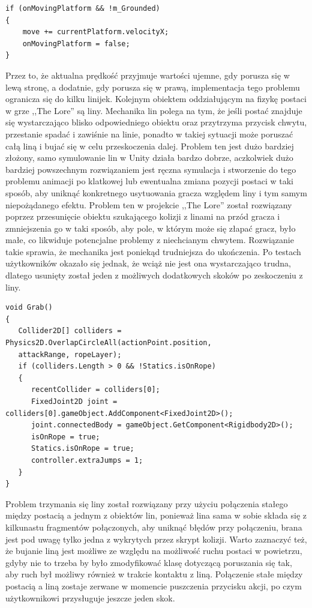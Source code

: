 \documentclass[oneside,polski,logo]{amuthesis}
\begin{document}
\begin{lstlisting}[breaklines=true,
language={[Sharp]C},
rulecolor=\color{blue!80!black},
caption={Fragment klasy \texttt{PlayerMovement.cs}}
]
if (onMovingPlatform && !m_Grounded)
{
	move += currentPlatform.velocityX;
	onMovingPlatform = false;
}
\end{lstlisting}
Przez to, że aktualna prędkość przyjmuje wartości ujemne, gdy porusza się w lewą stronę, a dodatnie, gdy porusza się w prawą, implementacja tego problemu ogranicza się do kilku linijek.
Kolejnym obiektem oddziałującym na fizykę postaci w grze ,,The Lore'' są liny. Mechanika lin polega na tym, że jeśli postać znajduje się wystarczająco blisko odpowiedniego obiektu oraz przytrzyma przycisk chwytu, przestanie spadać i zawiśnie na linie, ponadto w takiej sytuacji może poruszać całą liną i bujać się w celu przeskoczenia dalej. Problem ten jest dużo bardziej złożony, samo symulowanie lin w Unity działa bardzo dobrze, aczkolwiek dużo bardziej powszechnym rozwiązaniem jest ręczna symulacja i stworzenie do tego problemu animacji po klatkowej lub ewentualna zmiana pozycji postaci w taki sposób, aby uniknąć konkretnego usytuowania gracza względem liny i tym samym niepożądanego efektu. Problem ten w projekcie ,,The Lore'' został rozwiązany poprzez przesunięcie obiektu szukającego kolizji z linami na przód gracza i zmniejszenia go w taki sposób, aby pole, w którym może się złapać gracz, było małe, co likwiduje potencjalne problemy z niechcianym chwytem. Rozwiązanie takie sprawia, że mechanika jest poniekąd trudniejsza do ukończenia. Po testach użytkowników okazało się jednak, że wciąż nie jest ona wystarczająco trudna, dlatego usunięty został jeden z możliwych dodatkowych skoków po zeskoczeniu z liny.

\newpage
\begin{lstlisting}[breaklines=true,
language={[Sharp]C},
rulecolor=\color{blue!80!black},
caption={Fragment klasy \texttt{PlayerMovement.cs}}
]    
void Grab()
{
   Collider2D[] colliders = Physics2D.OverlapCircleAll(actionPoint.position,
   attackRange, ropeLayer);
   if (colliders.Length > 0 && !Statics.isOnRope)
   {
      recentCollider = colliders[0];
      FixedJoint2D joint = colliders[0].gameObject.AddComponent<FixedJoint2D>();
      joint.connectedBody = gameObject.GetComponent<Rigidbody2D>();
      isOnRope = true;
      Statics.isOnRope = true;
      controller.extraJumps = 1;
   }
}
\end{lstlisting}

Problem trzymania się liny został rozwiązany przy użyciu połączenia stałego między postacią a jednym z obiektów lin, ponieważ lina sama w sobie składa się z kilkunastu fragmentów połączonych, aby uniknąć błędów przy połączeniu, brana jest pod uwagę tylko jedna z wykrytych przez skrypt kolizji. Warto zaznaczyć też, że bujanie liną jest możliwe ze względu na możliwość ruchu postaci w powietrzu, gdyby nie to trzeba by było zmodyfikować klasę dotyczącą poruszania się tak, aby ruch był możliwy również w trakcie kontaktu z liną. Połączenie stałe między postacią a liną zostaje zerwane w momencie puszczenia przycisku akcji, po czym użytkownikowi przysługuje jeszcze jeden skok.
\end{document}
